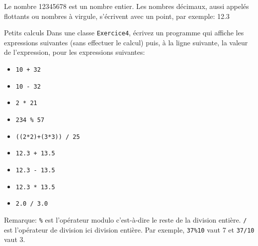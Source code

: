 \documentclass[a4paper,11pt]{style-esi/td}
\begin{document}
Le nombre 12345678 est un nombre entier. Les nombres décimaux, aussi appelés flottants ou nombres à virgule, s'écrivent avec un point, par exemple: 12.3



\begin{Exercice}{Petits calculs}
	Dans une classe \texttt{Exercice4}, écrivez un programme qui affiche les expressions suivantes (sans effectuer le calcul) puis, à la ligne suivante,
	la valeur de l'expression, pour les expressions	suivantes:
	\begin{itemize}
		\item \texttt{10 + 32}
		\item \texttt{10 - 32}
		\item \texttt{2 * 21}
		\item \texttt{234 \% 57}
		\item \texttt{((2*2)+(3*3)) / 25}
		\item \texttt{12.3 + 13.5}
		\item \texttt{12.3 - 13.5}
		\item \texttt{12.3 * 13.5}
		\item \texttt{2.0 / 3.0}
	\end{itemize}

	Remarque: \texttt{\%} est l'opérateur modulo c'est-à-dire le reste de la division entière.
	\texttt{/} est l'opérateur de division ici division entière. Par exemple,
	\texttt{37\%10} vaut 7 et \texttt{37/10} vaut 3.

\end{Exercice}
\end{document}
